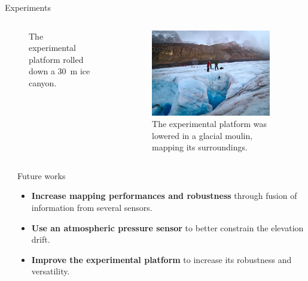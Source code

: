 \documentclass[final,hyperref={pdfpagelabels=false}]{beamer}
\begin{document}
\begin{frame}[t]
\begin{columns}[t]
\begin{column}{.970\textwidth}
\begin{block}{Experiments}
\begin{columns}
\begin{minipage}{.33\textwidth}
\begin{figure}
				\caption{The experimental platform rolled down a \SI{30}{\meter} ice canyon. \textcolor{white}{ugly spacefillerto break a line}}
			\end{figure}
		\end{minipage}
		\begin{minipage}{.33\textwidth} %
			\centering
			\begin{figure}
				\includegraphics[height=.65\linewidth]{figures/sphere_moulin_improved_small.jpg}
				\caption{The experimental platform was lowered in a glacial moulin, mapping its surroundings.}
			\end{figure}
		\end{minipage}
		\hfill
	\end{columns} %
\end{block}
\end{column}

\begin{column}{.015\textwidth}\end{column} %
\end{columns}


\begin{columns}[t] 

\begin{column}{.02\textwidth}\end{column} %

\begin{column}{.465\textwidth} %
\begin{block}{Future works}
	\begin{itemize}
		\item \textbf{Increase mapping performances and robustness} through fusion of information from several sensors.
		\item \textbf{Use an atmospheric pressure sensor} to better constrain the elevation drift.
		\item \textbf{Improve the experimental platform} to increase its robustness and versatility. 
	\end{itemize}
\end{block}
\end{column}


\end{columns}
\end{frame}
\end{document}
